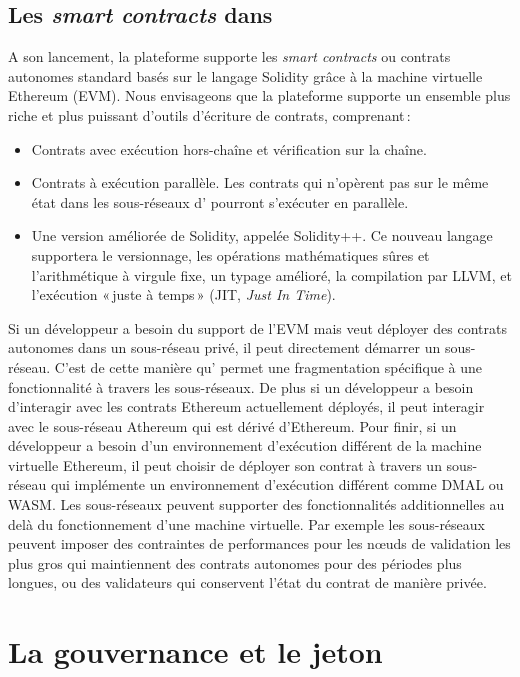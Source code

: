 \documentclass[runningheads,francais,a4paper]{llncs}
\begin{document}
\subsection{Les \emph{smart contracts} dans \AVATokenName}
A son lancement, la plateforme \AVAPlatformName{} supporte les \emph{smart contracts} ou contrats autonomes standard basés sur le langage
Solidity grâce à la machine virtuelle Ethereum (EVM). Nous envisageons que la plateforme supporte un ensemble plus
riche et plus puissant d'outils d'écriture de contrats, comprenant\,:
\begin{itemize}
\item Contrats avec exécution hors-chaîne et vérification sur la chaîne.
\item Contrats à exécution parallèle. Les contrats qui n'opèrent pas sur le même état dans 
les sous-réseaux d'\AVAPlatformName{} pourront s'exécuter en parallèle.
\item Une version améliorée de Solidity, appelée Solidity++. Ce nouveau langage supportera le versionnage, les opérations
mathématiques sûres et l'arithmétique à virgule fixe, un typage amélioré, la compilation par LLVM, et l'exécution
«\,juste à temps\,» (JIT, \emph{Just In Time}).
\end{itemize}

Si un développeur a besoin du support de l'EVM mais veut déployer des contrats autonomes dans un sous-réseau privé,
il peut directement démarrer un sous-réseau. C'est de cette manière qu'\AVAPlatformName{} permet une fragmentation spécifique
à une fonctionnalité à travers les sous-réseaux. De plus si un développeur a besoin d'interagir avec les contrats
Ethereum actuellement déployés, il peut interagir avec le sous-réseau Athereum qui est dérivé d'Ethereum.
Pour finir, si un développeur a besoin d'un environnement d'exécution différent de la machine virtuelle Ethereum, il peut
choisir de déployer son contrat à travers un sous-réseau qui implémente un environnement d'exécution
différent comme DMAL ou WASM. Les sous-réseaux peuvent supporter des fonctionnalités additionnelles au delà du
fonctionnement d'une machine virtuelle. Par exemple les sous-réseaux peuvent imposer des contraintes de performances
pour les nœuds de validation les plus gros qui maintiennent des contrats autonomes pour des périodes plus longues,
ou des validateurs qui conservent l'état du contrat de manière privée.

\section{La gouvernance et le jeton \AVATokenName{}}
\label{section:governance_and_token}
\end{document}
